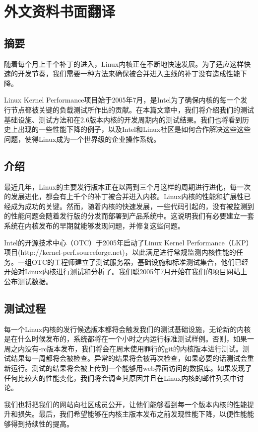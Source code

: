 

\chapter{外文资料书面翻译}


\section*{摘要}
随着每个月上千个补丁的进入，Linux内核正在不断地快速发展。为了适应这样快速的开发节奏，我们需要一种方法来确保被合并进入主线的补丁没有造成性能下降。

Linux Kernel Performance项目始于2005年7月，是Intel为了确保内核的每一个发行节点都被关键的负载测试所作出的贡献。在本篇文章中，我们将介绍我们的测试基础设施、测试方法和在2.6版本内核的开发周期内的测试结果。我们也将看到历史上出现的一些性能下降的例子，以及Intel和Linux社区是如何合作解决这些这些问题，使得Linux成为一个世界级的企业操作系统。
\section{介绍}
最近几年，Linux的主要发行版本正在以两到三个月这样的周期进行进化，每一次的发展进化，都会有上千个的补丁被合并进入内核。Linux内核的性能和扩展性已经成为成功的关键。然而，随着内核的快速发展，一些代码引起的，没有被监测到的性能问题会随着发行版的分发而部署到产品系统中。这说明我们有必要建立一套系统在内核发布的早期就能够发现问题，并修复这些问题。

Intel的开源技术中心（OTC）于2005年启动了Linux Kernel Performance（LKP）项目(http://kernel-perf.sourceforge.net)，以此满足进行常规监测内核性能的任务。一组OTC的工程师建立了测试服务器，基础设施和标准测试集合，他们已经开始对Linux内核进行测试和分析了。我们聪2005年7月开始在我们的项目网站上公布测试数据。
\section{测试过程}
每一个Linux内核的发行候选版本都将会触发我们的测试基础设施，无论新的内核是在什么时候发布的，系统都将在一个小时之内运行标准测试样例。否则，如果一周之内没有-rc版本发布，我们将会在周末使用罪行的git的内核版本进行测试。测试结果每一周都将会被检查。异常的结果将会被再次检查，如果必要的话测试会重新运行。测试的结果将会被上传到一个能够用web界面访问的数据库。如果发现了任何比较大的性能变化，我们将会调查其原因并且在Linux内核的邮件列表中讨论。

我们也将把我们的网站向社区成员公开，让他们能够看到每一个版本内核的性能提升和损失。最后，我们希望能够在内核主版本发布之前发现性能下降，以便性能能够得到持续性的提高。
